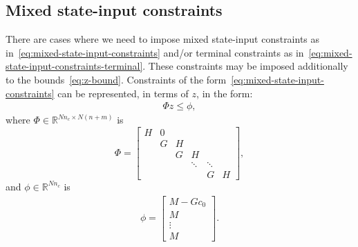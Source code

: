 \documentclass[12pt]{scrartcl}
\renewcommand{\Re}{\mathbb{R}}
\begin{document}
\subsection*{Mixed state-input constraints}
There are cases where we need to impose mixed state-input constraints 
as in~\eqref{eq:mixed-state-input-constraints} and/or
terminal constraints as in~\eqref{eq:mixed-state-input-constraints-terminal}.
These constraints may be imposed additionally to the bounds~\eqref{eq:z-bound}.
Constraints of the form~\eqref{eq:mixed-state-input-constraints} can be 
represented, in terms of $z$, in the form:
\begin{align}
\Phi z \leq \phi,
\end{align}
where $\Phi\in\Re^{Nn_c\times N(n+m)}$ is
\begin{equation}
\Phi=\left[\begin{array}{cccccc}
H & 0\\
& G  & H\\
&& G & H \\
&&& \ddots & \ddots\\
&&&& G & H
\end{array}\right],
\end{equation}
and $\phi\in\Re^{Nn_c}$ is
\begin{align}
\phi=\left[ \begin{array}{c}
M-Gc_0\\
M\\
\vdots\\
M
\end{array}\right].
\end{align}
\end{document}
